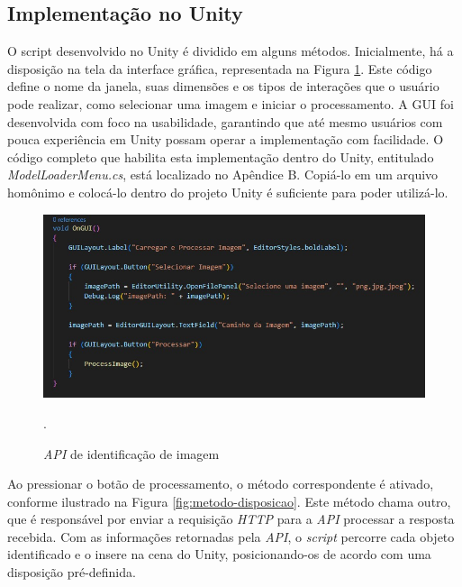 \subsection{Implementação no Unity}

O script desenvolvido no Unity é dividido em alguns métodos. Inicialmente, há a disposição na tela da interface gráfica, representada na Figura \ref{fig:metodo-gui}. Este código define o nome da janela, suas dimensões e os tipos de interações que o usuário pode realizar, como selecionar uma imagem e iniciar o processamento. A GUI foi desenvolvida com foco na usabilidade, garantindo que até mesmo usuários com pouca experiência em Unity possam operar a implementação com facilidade. O código completo que habilita esta implementação dentro do Unity, entitulado \textit{ModelLoaderMenu.cs}, está localizado no Apêndice B. Copiá-lo em um arquivo homônimo e colocá-lo dentro do projeto Unity é suficiente para poder utilizá-lo.

\begin{figure}[!h]
    \centering
    \begin{minipage}{0.7\linewidth}
    \centering
    \captionsetup{justification=centering,margin=0.5cm,font=small}
    \includegraphics[width=1\linewidth]{img/cap5/gui-codigo.jpeg}
    \caption{\textit{API} de identificação de imagem}.
    \label{fig:metodo-gui}
    \end{minipage}
\end{figure}

Ao pressionar o botão de processamento, o método correspondente é ativado, conforme ilustrado na Figura \ref{fig:metodo-disposicao}. Este método chama outro, que é responsável por enviar a requisição \textit{HTTP} para a \textit{API} processar a resposta recebida. Com as informações retornadas pela \textit{API}, o \textit{script} percorre cada objeto identificado e o insere na cena do Unity, posicionando-os de acordo com uma disposição pré-definida. 

